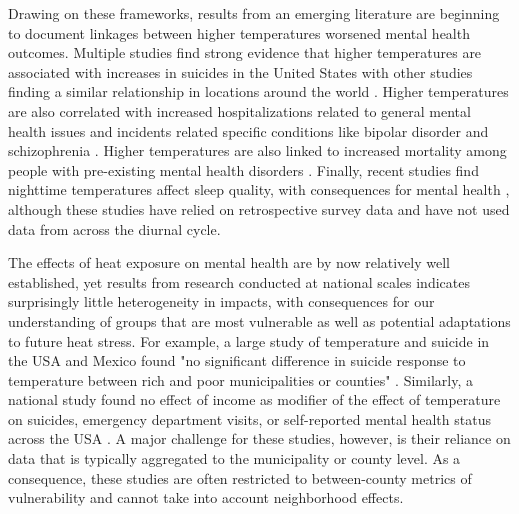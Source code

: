 \documentclass[fleqn,10pt]{wlscirep}
\begin{document}
Drawing on these frameworks, results from an emerging literature are beginning to document linkages between higher temperatures worsened mental health outcomes. Multiple studies find strong evidence that higher temperatures are associated with increases in suicides in the United States \cite{Burke2018Aug, Mullins2019Dec, Dixon2007May} with other studies finding a similar relationship in locations around the world \cite{Qi2014Dec, Likhvar2011Jan}. Higher temperatures are also correlated with increased hospitalizations related to general mental health issues \cite{Obradovich2018Oct, Mullins2019Dec} and incidents related specific conditions like bipolar disorder and schizophrenia \cite{Lee2007Jan, Sung2013Feb}. Higher temperatures are also linked to increased mortality among people with pre-existing mental health disorders \cite{Hansen2008Oct}.  Finally, recent studies find nighttime temperatures affect sleep quality, with consequences for mental health \cite{Obradovich2017May, Mullins2019Dec}, although these studies have relied on retrospective survey data and have not used data from across the diurnal cycle. 

The effects of heat exposure on mental health are by now relatively well established, yet results from research conducted at national scales indicates surprisingly little heterogeneity in impacts, with consequences for our understanding of groups that are most vulnerable as well as potential adaptations to future heat stress. For example, a large study of temperature and suicide in the USA and Mexico found "no significant difference in suicide response to temperature between rich and poor municipalities or counties" \cite{Burke2018Aug}. Similarly, a national study found no effect of income as modifier of the effect of temperature on suicides, emergency department visits, or self-reported mental health status across the USA \cite{Mullins2019Dec}. A major challenge for these studies, however, is their reliance on data that is typically aggregated to the municipality or county level. As a consequence, these studies are often restricted to between-county metrics of vulnerability and cannot take into account neighborhood effects.
\end{document}

